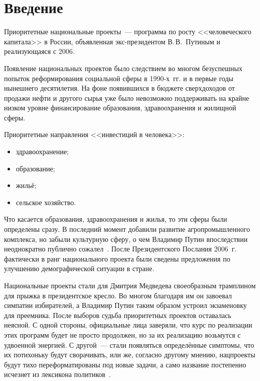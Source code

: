 \documentclass[article, 12pt, russian, oneside]{ncc}
\begin{document}
 \thispagestyle{empty}
\tableofcontents
\newpage

\noheadingtag
\section{Введение}

Приоритетные национальные проекты~--- программа по росту
<<человеческого капитала>> в России, объявленная экс-президентом
В.\,В.~Путиным и реализующаяся с 2006.

Появление национальных проектов было следствием во многом безуспешных
попыток реформирования социальной сферы в 1990-х~гг. и в первые годы
нынешнего десятилетия. На фоне появившихся в бюджете сверхдоходов от
продажи нефти и другого сырья уже было невозможно поддерживать на
крайне низком уровне финансирование образования, здравоохранения и
жилищной сферы.

Приоритетные направления <<инвестиций в человека>>:

\begin{itemize}
\item здравоохранение;
\item образование;
\item жильё;
\item сельское хозяйство.
\end{itemize}

Что касается образования, здравоохранения и жилья, то эти сферы были
определены сразу. В последний момент добавили развитие
агропромышленного комплекса, но забыли культурную сферу, о чем
Владимир Путин впоследствии неоднократно публично
сожалел~\cite{Spero}. После Президентского Послания 2006~г. фактически
в ранг национального проекта были сведены предложения по улучшению
демографической ситуации в стране.

Национальные проекты стали для Дмитрия Медведева своеобразным \linebreak
трамплином для прыжка в президентское кресло. Во многом благодаря им
он завоевал симпатии избирателей, а Владимир Путин таким образом
устроил экзаменовку для преемника. После выборов судьба приоритетных
проектов оставалась неясной. С одной стороны, официальные лица
заверяли, что курс по реализации этих программ будет не просто
продолжен, но за их реализацию возьмутся с удвоенной энергией. С
другой~--- стали появляться определённые симптомы, что их потихоньку
будут сворачивать, или же, согласно другому мнению, нацпроекты будут
тихо переформатированы под новые задачи, а само название постепенно
исчезнет из лексикона политиков~\cite{Versia}.
\end{document}
